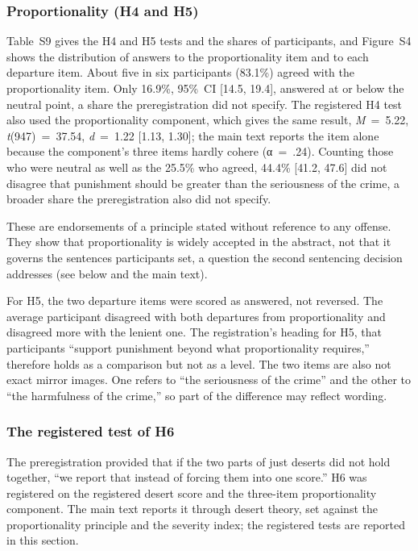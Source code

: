 \subsubsection{Proportionality (H4 and H5)}\label{proportionality-h4-and-h5}

Table~S9 gives the H4 and H5 tests and the shares of participants, and Figure~S4 shows the distribution of answers to the proportionality item and to each departure item. About five in six participants (83.1\%) agreed with the proportionality item. Only 16.9\%, 95\%~CI {[}14.5, 19.4{]}, answered at or below the neutral point, a share the preregistration did not specify. The registered H4 test also used the proportionality component, which gives the same result, \emph{M}~=~5.22, \emph{t}(947)~=~37.54, \emph{d}~=~1.22 {[}1.13, 1.30{]}; the main text reports the item alone because the component's three items hardly cohere (α~=~.24). Counting those who were neutral as well as the 25.5\% who agreed, 44.4\% {[}41.2, 47.6{]} did not disagree that punishment should be greater than the seriousness of the crime, a broader share the preregistration also did not specify.

These are endorsements of a principle stated without reference to any offense. They show that proportionality is widely accepted in the abstract, not that it governs the sentences participants set, a question the second sentencing decision addresses (see below and the main text).

For H5, the two departure items were scored as answered, not reversed. The average participant disagreed with both departures from proportionality and disagreed more with the lenient one. The registration's heading for H5, that participants ``support punishment beyond what proportionality requires,'' therefore holds as a comparison but not as a level. The two items are also not exact mirror images. One refers to ``the seriousness of the crime'' and the other to ``the harmfulness of the crime,'' so part of the difference may reflect wording.

\subsubsection{The registered test of H6}\label{the-registered-test-of-h6}

The preregistration provided that if the two parts of just deserts did not hold together, ``we report that instead of forcing them into one score.'' H6 was registered on the registered desert score and the three-item proportionality component. The main text reports it through desert theory, set against the proportionality principle and the severity index; the registered tests are reported in this section.

